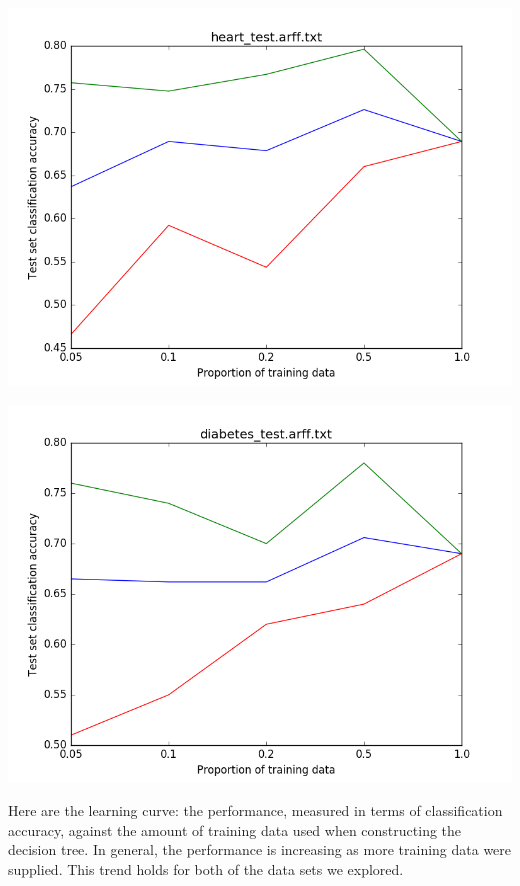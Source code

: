 \documentclass[paper=a4, fontsize=11pt]{scrartcl} %
\numberwithin{equation}{section} %
\numberwithin{figure}{section} %
\numberwithin{table}{section} %
\begin{document}
\begin{center}
\includegraphics[scale=.5]{pics/heart_acc_data.png}
\end{center}
\begin{center}
\includegraphics[scale=.5]{pics/diabetes_acc_data.png}
\end{center}

Here are the learning curve: the performance,  measured in terms of classification accuracy,  against the amount of training data used when constructing the decision tree. In general, the performance is increasing as more training data were supplied. This trend holds for both of the data sets we explored. 

\newpage
\end{document}
